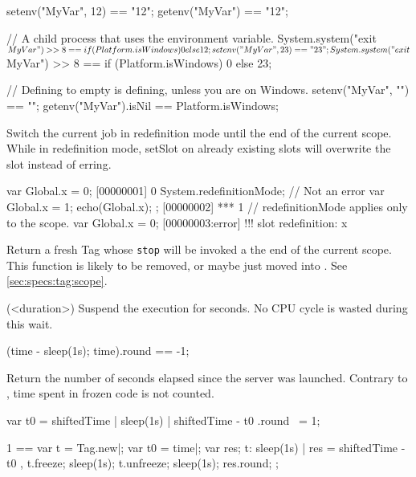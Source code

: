 \begin{urbiscriptapi}
\begin{urbiassert}
setenv("MyVar", 12) == "12";
getenv("MyVar") == "12";

// A child process that uses the environment variable.
System.system("exit $MyVar") >> 8 ==
       {if (Platform.isWindows) 0 else 12};
setenv("MyVar", 23) == "23";
System.system("exit $MyVar") >> 8 ==
       {if (Platform.isWindows) 0 else 23};

// Defining to empty is defining, unless you are on Windows.
setenv("MyVar", "") == "";
getenv("MyVar").isNil == Platform.isWindows;
\end{urbiassert}

\item[redefinitionMode] Switch the current job in redefinition mode
  until the end of the current scope.  While in redefinition mode,
  setSlot on already existing slots will overwrite the slot instead of
  erring.

\begin{urbiscript}
var Global.x = 0;
[00000001] 0
{
  System.redefinitionMode;
  // Not an error
  var Global.x = 1;
  echo(Global.x);
};
[00000002] *** 1
// redefinitionMode applies only to the scope.
var Global.x = 0;
[00000003:error] !!! slot redefinition: x
\end{urbiscript}

\item[scopeTag] Return a fresh Tag whose \lstinline|stop| will be
  invoked a the end of the current scope.  This function is likely to
  be removed, or maybe just moved into .  See
  \autoref{sec:specs:tag:scope}.

\item[sleep](<duration>)%
  Suspend the execution for  seconds.  No CPU cycle is
  wasted during this wait.

\begin{urbiassert}
(time - {sleep(1s); time}).round == -1;
\end{urbiassert}

\item[shiftedTime] Return the number of seconds elapsed since the
  \urbi server was launched.  Contrary to ,
  time spent in frozen code is not counted.
\begin{urbiassert}
{ var t0 = shiftedTime | sleep(1s) | shiftedTime - t0 }.round ~= 1;

  1 ==
  {
    var t = Tag.new|;
    var t0 = time|;
    var res;
    t: { sleep(1s) | res = shiftedTime - t0 },
    t.freeze;
    sleep(1s);
    t.unfreeze;
    sleep(1s);
    res.round;
  };
\end{urbiassert}


\end{urbiscriptapi}
